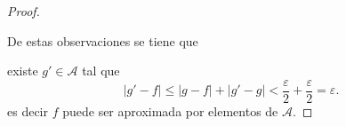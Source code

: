 \begin{proof}
\begin{itemize}
    \end{itemize}
    De estas observaciones se tiene que 

    existe $g' \in \mathcal{A}$ tal que 
    \begin{equation}
        |g'-f| \leq |g-f| + |g'-g| 
        <
         \frac{\varepsilon}{2} + \frac{\varepsilon}{2} 
        = 
        \varepsilon.
    \end{equation}
    es decir $f$ puede ser aproximada por elementos de $\mathcal{A}$.
\end{proof}
